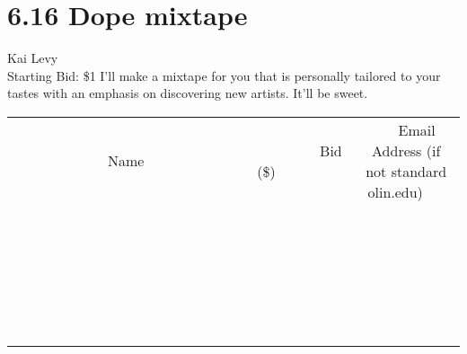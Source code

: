 \documentclass[11pt]{article}
\begin{document}
\section*{6.16 Dope mixtape}
Kai Levy
\\
Starting Bid: \$1
\newline
I'll make a mixtape for you that is personally tailored to your tastes with an emphasis on discovering new artists. It'll be sweet.
\\[6ex]
\begin{tabular}{c c c}
~~~~~~~~~~~~~Name~~~~~~~~~~~~~ & ~~~~~~~~~Bid (\$)~~~~~~~~~  & ~~~Email Address (if not standard olin.edu)~~~\\
 & & \\
\hline
 & & \\
\hline
 & & \\
\hline
 & & \\
\hline
 & & \\
\hline
 & & \\
\hline
 & & \\
\hline
 & & \\
\hline
 & & \\
\hline
 & & \\
\hline
 & & \\
\hline
 & & \\
\hline
 & & \\
\hline
 & & \\
\hline
 & & \\
\hline
 & & \\
\hline
 & & \\
\hline
 & & \\
\hline
 & & \\
\hline
 & & \\
\hline
 & & \\
\hline
 & & \\
\hline
 & & \\
\hline
 & & \\
\hline
 & & \\
\hline
 & & \\
\hline
\end{tabular}
\newpage
\end{document}
